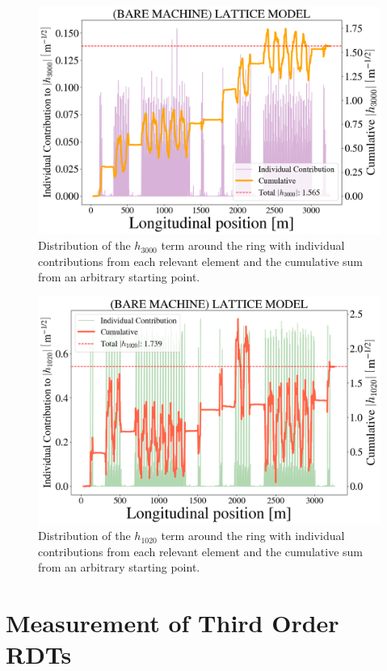 \begin{figure}[H]
    \centering
    \includegraphics[width=0.88\columnwidth]{chapter4/h3000_bare.png}
    \caption{Distribution of the $h_{3000}$ term around the ring with individual contributions from each relevant element and the cumulative sum from an arbitrary starting point.}
    \label{fig:h3000bare}
\end{figure}

\begin{figure}[H]
    \centering
    \includegraphics[width=0.88\columnwidth]{chapter4/h1020_bare.png}
    \caption{Distribution of the $h_{1020}$ term around the ring with individual contributions from each relevant element and the cumulative sum from an arbitrary starting point.}
    \label{fig:h1020bare}
\end{figure}

\section{\label{sec:rdtmeasure}Measurement of Third Order RDTs}

